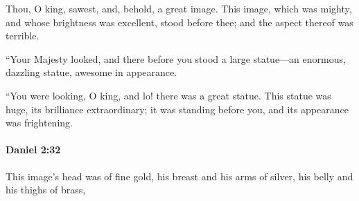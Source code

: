 			\begin{versebox}
					\item[BHS] 
					\item[LXX] 
					\item[ASV] Thou, O king, sawest, and, behold, a great image. This image, which was mighty, and whose brightness was excellent, stood before thee; and the aspect thereof was terrible.
					\item[NIV] “Your Majesty looked, and there before you stood a large statue—an enormous, dazzling statue, awesome in appearance.
					\item[NRSV] “You were looking, O king, and lo! there was a great statue. This statue was huge, its brilliance extraordinary; it was standing before you, and its appearance was frightening.
			\end{versebox}

		\paragraph{Daniel 2:32} %
			\label{DANIEL-2-32}

			This image’s head was of fine gold, his breast and his arms of silver, his belly and his thighs of brass,

